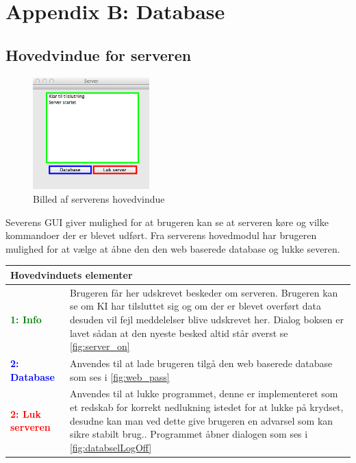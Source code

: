 \chapter*{Appendix B: Database}
\section*{Hovedvindue for serveren}
\begin{figure}[htbp]
	\centering
	\includegraphics[width=0.4\textwidth]{billeder/database/server}
	\caption{Billed af serverens hovedvindue}
	\label{fig:server}
\end{figure}
Severens GUI giver mulighed for at brugeren kan se at serveren køre og vilke kommandoer der er blevet udført. Fra serverens hovedmodul har brugeren mulighed for at vælge at åbne den den web baserede database og lukke severen.
\begin{table}[H]
\begin{tabular}{l p{12.5cm}}
\multicolumn{2}{l}{Hovedvinduets elementer} \\
\hline
\textcolor{green}{\textbf{1: Info}}
&Brugeren får her udskrevet beskeder om serveren. Brugeren kan se om KI har tilsluttet sig og om der er blevet overført data desuden vil fejl meddelelser blive udskrevet her. Dialog boksen er lavet sådan at den nyeste besked altid står øverst se \ref{fig:server_on}\\

\textcolor{blue}{\textbf{2: Database}}
&Anvendes til at lade brugeren tilgå den web baserede database som ses i \ref{fig:web_pass}\\

\textcolor{red}{\textbf{2: Luk serveren}}
&Anvendes til at lukke programmet, denne er implementeret som et redskab for korrekt nedlukning istedet for at lukke på krydset, desudne kan man ved dette give brugeren en advarsel som kan sikre stabilt brug.. Programmet åbner dialogen som ses i \ref{fig:databselLogOff}\\

\end{tabular}
\end{table}


